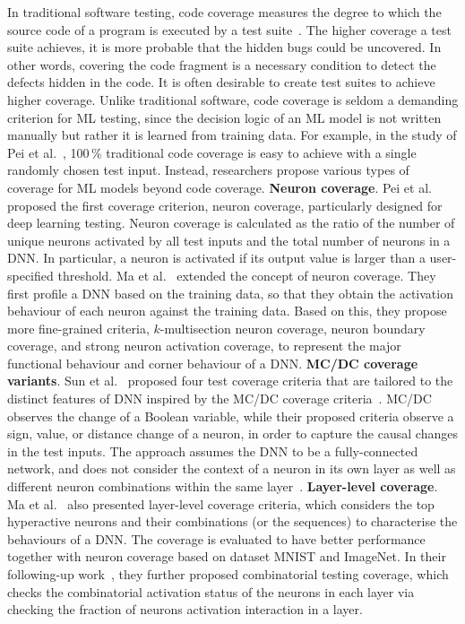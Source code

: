 In traditional software testing, code coverage measures the degree to which the source code of a program is executed by a test suite~. 
The higher coverage a test suite achieves, it is more probable that the hidden bugs could be uncovered. In other words, covering the code fragment is a necessary condition to detect the defects hidden in the code. It is often desirable to create test suites to achieve higher coverage.
Unlike traditional software, code coverage is seldom a demanding criterion for ML testing, since the decision logic of an ML model is not written manually but rather it is learned from training data.
For example, in the study of Pei et al.~, 100\,\% traditional code coverage is easy to achieve with a single randomly chosen test input.
Instead, researchers propose various types of coverage for ML models beyond code coverage.
\noindent \textbf{Neuron coverage}.
Pei et al.~ proposed the first coverage criterion, neuron coverage, particularly designed for deep learning testing.
Neuron coverage is calculated as the ratio of the number of unique neurons activated by all test inputs and the total number of neurons in a DNN. In particular, a neuron is activated if its output value is larger than a user-specified threshold. 
Ma et al.~ extended the concept of neuron coverage. They first profile a DNN based on the training data, so that they obtain the activation behaviour of each neuron against the training data. Based on this, they propose more fine-grained criteria, $k$-multisection neuron coverage, neuron boundary coverage, and strong neuron activation coverage, to represent the major functional behaviour and corner behaviour of a DNN.
\noindent \textbf{MC/DC coverage variants}.
Sun et al.~ proposed four test coverage criteria that are tailored to the distinct features of DNN inspired by the MC/DC coverage criteria~.
MC/DC observes the change of a Boolean variable, while their proposed criteria observe a sign, value, or distance change of a neuron, in order to capture the causal changes in the test inputs.
The approach assumes the DNN to be a fully-connected network, and does not consider the context of a neuron in its own layer as well as different neuron combinations within the same layer~.
\noindent\textbf{Layer-level coverage}.
Ma et al.~ also presented layer-level coverage criteria, which considers the top hyperactive neurons and their combinations (or the sequences) to characterise the behaviours of a DNN.
The coverage is evaluated to have better performance together with neuron coverage based on dataset MNIST and ImageNet.
In their following-up work~, they further proposed combinatorial testing coverage, which checks the combinatorial activation status of the neurons in each layer via checking the fraction of neurons activation interaction in a layer.
